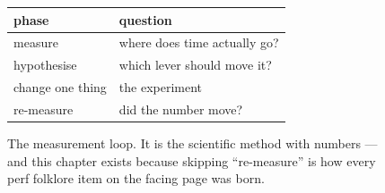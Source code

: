 \begin{figure}[htbp]
\centering
\begin{tabular}{ll}
\toprule
phase & question \\
\midrule
measure & where does time actually go? \\
hypothesise & which lever should move it? \\
change one thing & the experiment \\
re-measure & did the number move? \\
\bottomrule
\end{tabular}
\caption{The measurement loop. It is the scientific method with
numbers --- and this chapter exists because skipping ``re-measure''
is how every perf folklore item on the facing page was born.}
\label{fig:loop15}
\end{figure}
